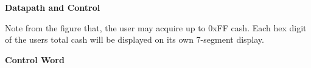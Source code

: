 \begin{enumerate}
\begin{onlysolution}
{%
 
\textbf{ Datapath and Control}

\begin{figure}[ht]
\end{figure}

Note from the figure that, the user may acquire
up to 0xFF cash.  Each hex digit of the users total cash will 
be displayed on its own 7-segment display.

\textbf{ Control Word}

}
\end{onlysolution}
\end{enumerate}
